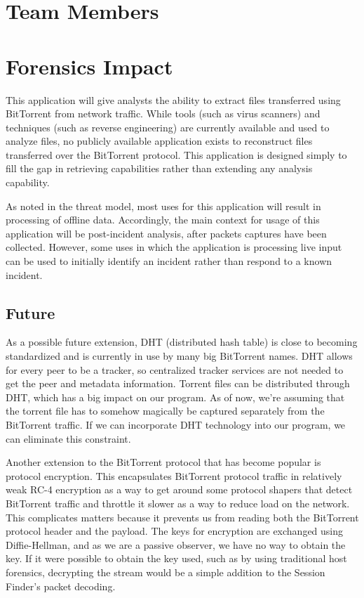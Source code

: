 \documentclass{acm_proc_article-sp}
\begin{document}
\section{Team Members}



\section{Forensics Impact}
This application will give analysts the ability to extract files transferred
using BitTorrent from network traffic. While tools (such as virus scanners) and
techniques (such as reverse engineering) are currently available and used to
analyze files, no publicly available application exists to reconstruct files
transferred over the BitTorrent protocol. This application is designed simply to
fill the gap in retrieving capabilities rather than extending any analysis
capability.

As noted in the threat model, most uses for this application will result in
processing of offline data. Accordingly, the main context for usage of this
application will be post-incident analysis, after packets captures have been
collected. However, some uses in which the application is processing live input
can be used to initially identify an incident rather than respond to a known
incident.

\subsection{Future}
As a possible future extension, DHT (distributed hash table) is close
to becoming standardized and is currently in use by many big BitTorrent names.
DHT allows for every peer to be a tracker, so centralized tracker services are
not needed to get the peer and metadata information. Torrent files can be
distributed through DHT, which has a big impact on our program.  As of now,
we're assuming that the torrent file has to somehow magically be captured
separately from the BitTorrent traffic.  If we can incorporate DHT technology
into our program, we can eliminate this constraint.

Another extension to the BitTorrent protocol that has become popular is
protocol encryption.  This encapsulates BitTorrent protocol traffic in
relatively weak RC-4 encryption as a way to get around some protocol shapers
that detect BitTorrent traffic and throttle it slower as a way to reduce load
on the network. This complicates matters because it prevents us from reading
both the BitTorrent protocol header and the payload. The keys for encryption
are exchanged using Diffie-Hellman, and as we are a passive observer, we have
no way to obtain the key.  If it were possible to obtain the key used, such as
by using traditional host forensics, decrypting the stream would be a simple
addition to the Session Finder's packet decoding.
\end{document}
